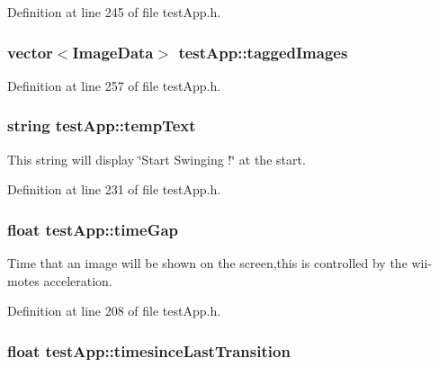 Definition at line 245 of file test\-App.\-h.

\hypertarget{classtest_app_a7f7226fc54fdb7d06366ed0fa3ab7ee3}{
\subsubsection[{tagged\-Images}]{\setlength{\rightskip}{0pt plus 5cm}vector$<${\bf Image\-Data}$>$ test\-App\-::tagged\-Images}}\label{classtest_app_a7f7226fc54fdb7d06366ed0fa3ab7ee3}


Definition at line 257 of file test\-App.\-h.

\hypertarget{classtest_app_ad9a4beab6f2e0f13d32b00b502e89bdc}{
\subsubsection[{temp\-Text}]{\setlength{\rightskip}{0pt plus 5cm}string test\-App\-::temp\-Text}}\label{classtest_app_ad9a4beab6f2e0f13d32b00b502e89bdc}


This string will display \char`\"{}\-Start Swinging !\char`\"{} at the start. 



Definition at line 231 of file test\-App.\-h.

\hypertarget{classtest_app_a944f2713019239a4b49241a5cc9a00c9}{
\subsubsection[{time\-Gap}]{\setlength{\rightskip}{0pt plus 5cm}float test\-App\-::time\-Gap}}\label{classtest_app_a944f2713019239a4b49241a5cc9a00c9}


Time that an image will be shown on the screen,this is controlled by the wii-\/motes acceleration. 



Definition at line 208 of file test\-App.\-h.

\hypertarget{classtest_app_acb60fb8a89e9ec5d461630a20b11ceda}{
\subsubsection[{timesince\-Last\-Transition}]{\setlength{\rightskip}{0pt plus 5cm}float test\-App\-::timesince\-Last\-Transition}}\label{classtest_app_acb60fb8a89e9ec5d461630a20b11ceda}


